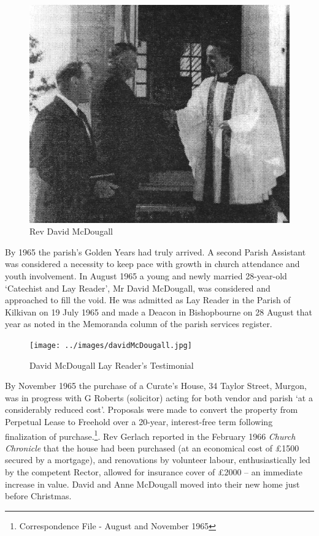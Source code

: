 \begin{figure}
\begin{center}
\includegraphics[width=1.\linewidth,center]{../images/DMcDougall.jpg}
\caption{Rev David McDougall}
\end{center}
\end{figure}




By 1965 the parish's Golden Years had truly arrived. A second Parish Assistant was considered a necessity to keep pace with growth in church attendance and youth involvement. In August 1965 a young and newly married 28-year-old `Catechist and Lay Reader', Mr David McDougall, was considered and approached to fill the void. He was admitted as Lay Reader in the Parish of Kilkivan on 19 July 1965 and made a Deacon in Bishopbourne on 28 August that year as noted in the Memoranda column of the parish services register.









\begin{figure}[!htb]
\begin{center}
\texttt{[image: ../images/davidMcDougall.jpg]}
\caption{David McDougall Lay Reader's Testimonial}
\end{center}
\end{figure}




By November 1965 the purchase of a Curate's House, 34 Taylor Street, Murgon, was in progress with G Roberts (solicitor) acting for both vendor and parish `at a considerably reduced cost'. Proposals were made to convert the property from Perpetual Lease to Freehold over a 20-year, interest-free term following finalization of purchase.\footnote{Correspondence File - August and November 1965}. Rev Gerlach reported in the February 1966 \emph{Church Chronicle} that the house had been purchased (at an economical cost of \pounds1500 secured by a mortgage), and renovations by volunteer labour, enthusiastically led by the competent Rector, allowed for insurance cover of \pounds2000 -- an immediate increase in value. David and Anne McDougall moved into their new home just before Christmas.


